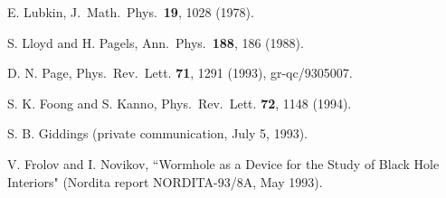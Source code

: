 \begin{thebibliography}{999}
 E. Lubkin, J.\ Math.\ Phys.\ {\bf 19}, 1028 (1978).

 S. Lloyd and H. Pagels, Ann.\ Phys.\ {\bf 188}, 186
(1988).

 D. N. Page, Phys.\ Rev.\ Lett. {\bf 71}, 1291
(1993),
gr-qc/9305007.

 S. K. Foong and S. Kanno, Phys.\ Rev.\ Lett. {\bf
72}, 1148 (1994).

 S. B. Giddings (private communication, July 5,
1993).

 V. Frolov and I. Novikov, ``Wormhole as a Device for
the
Study of Black Hole Interiors" (Nordita report NORDITA-93/8A, May
1993).

	\end{thebibliography}


